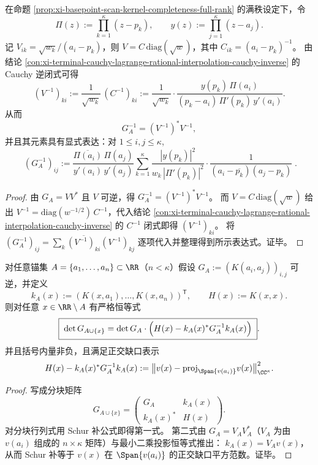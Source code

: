 \begin{proposition}\label{prop:xi-basepoint-scan-gram-inverse-closed-form}
在命题 \ref{prop:xi-basepoint-scan-kernel-completeness-full-rank} 的满秩设定下，令
\[
\Pi(z):=\prod_{k=1}^{\kappa}(z-p_k),\qquad
y(z):=\prod_{j=1}^{\kappa}(z-a_j).
\]
记 \(V_{ik}=\sqrt{w_k}/(a_i-p_k)\)，则 \(V=C\,\mathrm{diag}(\sqrt w)\)，其中 \(C_{ik}=(a_i-p_k)^{-1}\)。
由结论 \ref{con:xi-terminal-cauchy-lagrange-rational-interpolation-cauchy-inverse} 的 Cauchy 逆闭式可得
\[
(V^{-1})_{k i}
:=\frac{1}{\sqrt{w_k}}\,(C^{-1})_{k i}
:=\frac{1}{\sqrt{w_k}}\cdot
\frac{y(p_k)\,\Pi(a_i)}{(p_k-a_i)\,\Pi'(p_k)\,y'(a_i)}.
\]
从而
\[
G_A^{-1}=(V^{-1})^\ast V^{-1},
\]
并且其元素具有显式表达：对 \(1\le i,j\le \kappa\),
\[
\boxed{\;
(G_A^{-1})_{ij}
:=
\frac{\overline{\Pi(a_i)}\,\Pi(a_j)}{y'(a_i)\,y'(a_j)}
\sum_{k=1}^{\kappa}
\frac{|y(p_k)|^2}{w_k\,|\Pi'(p_k)|^2}\cdot
\frac{1}{(a_i-\overline{p_k})(a_j-p_k)}\; }.
\]
\end{proposition}
\begin{proof}
由 \(G_A=VV^\ast\) 且 \(V\) 可逆，得 \(G_A^{-1}=(V^{-1})^\ast V^{-1}\)。
而 \(V=C\,\mathrm{diag}(\sqrt w)\) 给出 \(V^{-1}=\mathrm{diag}(w^{-1/2})\,C^{-1}\)，代入结论 \ref{con:xi-terminal-cauchy-lagrange-rational-interpolation-cauchy-inverse} 的 \(C^{-1}\) 闭式即得 \((V^{-1})_{ki}\)。
将
\(
(G_A^{-1})_{ij}=\sum_{k}\overline{(V^{-1})_{ki}}(V^{-1})_{kj}
\)
逐项代入并整理得到所示表达式。证毕。
\end{proof}



\begin{proposition}\label{prop:xi-basepoint-scan-gram-determinant-schur-increment}
对任意锚集 \(A=\{a_1,\dots,a_n\}\subset\RR\)（\(n<\kappa\)）假设 \(G_A:=(K(a_i,a_j))_{i,j}\) 可逆，并定义
\[
k_A(x):=(K(x,a_1),\dots,K(x,a_n))^{\mathsf T},\qquad
H(x):=K(x,x).
\]
则对任意 \(x\in\RR\setminus A\) 有严格恒等式
\[
\boxed{\;
\det G_{A\cup\{x\}}=\det G_A\cdot\Bigl(H(x)-k_A(x)^\ast G_A^{-1}k_A(x)\Bigr)\; } .
\]
并且括号内量非负，且满足正交缺口表示
\[
H(x)-k_A(x)^\ast G_A^{-1}k_A(x)
:=\bigl\|v(x)-\mathrm{proj}_{\Span\{v(a_i)\}}v(x)\bigr\|_{\CC^\kappa}^{2}.
\]
\end{proposition}
\begin{proof}
写成分块矩阵
\[
G_{A\cup\{x\}}=
\begin{pmatrix}
G_A & k_A(x)\\
k_A(x)^\ast & H(x)
\end{pmatrix}.
\]
对分块行列式用 Schur 补公式即得第一式。
第二式由 \(G_A=V_AV_A^\ast\)（\(V_A\) 为由 \(v(a_i)\) 组成的 \(n\times\kappa\) 矩阵）与最小二乘投影恒等式推出：
\(
k_A(x)=V_A v(x)
\)，从而 Schur 补等于 \(v(x)\) 在 \(\Span\{v(a_i)\}\) 的正交缺口平方范数。证毕。
\end{proof}

